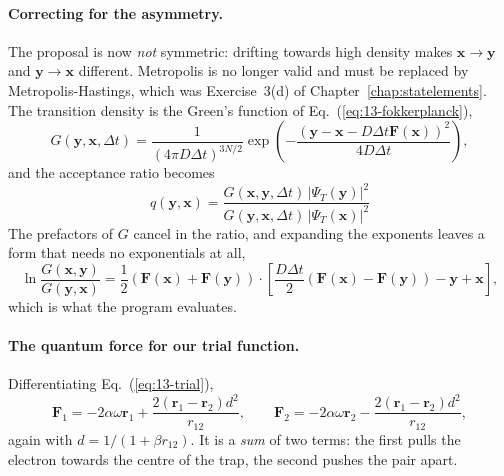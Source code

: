 \paragraph{Correcting for the asymmetry.}
The proposal is now \emph{not} symmetric: drifting towards high density makes
$\bm{x}\to\bm{y}$ and $\bm{y}\to\bm{x}$ different.  Metropolis is no longer
valid and must be replaced by Metropolis-Hastings, which was Exercise~3(d) of
Chapter~\ref{chap:statelements}.  The transition density is the Green's
function of Eq.~(\ref{eq:13-fokkerplanck}),
\begin{equation}
  G(\bm{y},\bm{x},\Delta t)
   = \frac{1}{(4\pi D\Delta t)^{3N/2}}
     \exp\left(-\frac{\left(\bm{y}-\bm{x}
       -D\Delta t\bm{F}(\bm{x})\right)^2}{4D\Delta t}\right),
  \label{eq:13-greensfunction}
\end{equation}
and the acceptance ratio becomes
\begin{equation}
  \boxed{\;
  q(\bm{y},\bm{x})
   = \frac{G(\bm{x},\bm{y},\Delta t)\,\left|\Psi_T(\bm{y})\right|^2}
          {G(\bm{y},\bm{x},\Delta t)\,\left|\Psi_T(\bm{x})\right|^2} \;}
  \label{eq:13-mhratio}
\end{equation}
The prefactors of $G$ cancel in the ratio, and expanding the exponents leaves
a form that needs no exponentials at all,
\begin{equation}
  \ln\frac{G(\bm{x},\bm{y})}{G(\bm{y},\bm{x})}
   = \frac{1}{2}\left(\bm{F}(\bm{x})+\bm{F}(\bm{y})\right)\cdot
     \left[\frac{D\Delta t}{2}
       \left(\bm{F}(\bm{x})-\bm{F}(\bm{y})\right)
       - \bm{y} + \bm{x}\right],
  \label{eq:13-greensratio}
\end{equation}
which is what the program evaluates.

\paragraph{The quantum force for our trial function.}
Differentiating Eq.~(\ref{eq:13-trial}),
\begin{equation}
  \bm{F}_1 = -2\alpha\omega\bm{r}_1
    + \frac{2\left(\bm{r}_1-\bm{r}_2\right)d^2}{r_{12}},
  \qquad
  \bm{F}_2 = -2\alpha\omega\bm{r}_2
    - \frac{2\left(\bm{r}_1-\bm{r}_2\right)d^2}{r_{12}},
  \label{eq:13-quantumforcedot}
\end{equation}
again with $d=1/(1+\beta r_{12})$.  It is a \emph{sum} of two terms: the first
pulls the electron towards the centre of the trap, the second pushes the pair
apart.

